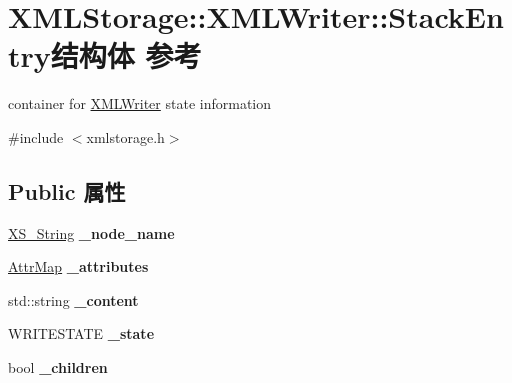 \hypertarget{struct_x_m_l_storage_1_1_x_m_l_writer_1_1_stack_entry}{}\section{X\+M\+L\+Storage\+:\+:X\+M\+L\+Writer\+:\+:Stack\+Entry结构体 参考}
\label{struct_x_m_l_storage_1_1_x_m_l_writer_1_1_stack_entry}


container for \hyperlink{struct_x_m_l_storage_1_1_x_m_l_writer}{X\+M\+L\+Writer} state information  




{\ttfamily \#include $<$xmlstorage.\+h$>$}

\subsection*{Public 属性}
\begin{DoxyCompactItemize}
\item 
\mbox{\label{struct_x_m_l_storage_1_1_x_m_l_writer_1_1_stack_entry_aa9c49efaac6709611c0035b524e575f8}} 
\hyperlink{struct_x_m_l_storage_1_1_x_s___string}{X\+S\+\_\+\+String} {\bfseries \+\_\+node\+\_\+name}
\item 
\mbox{\label{struct_x_m_l_storage_1_1_x_m_l_writer_1_1_stack_entry_a262e3e7c170634a204ea9973b3bfd070}} 
\hyperlink{struct_x_m_l_storage_1_1_x_m_l_node_1_1_attribute_map}{Attr\+Map} {\bfseries \+\_\+attributes}
\item 
\mbox{\label{struct_x_m_l_storage_1_1_x_m_l_writer_1_1_stack_entry_a4535717e47c17b42f97d937be53a0a92}} 
std\+::string {\bfseries \+\_\+content}
\item 
\mbox{\label{struct_x_m_l_storage_1_1_x_m_l_writer_1_1_stack_entry_aee11b91bb5ef42b48ab98c34d1ed29ca}} 
W\+R\+I\+T\+E\+S\+T\+A\+TE {\bfseries \+\_\+state}
\item 
\mbox{\label{struct_x_m_l_storage_1_1_x_m_l_writer_1_1_stack_entry_ae535a5d3e8bad705bc67fdc4f3a65969}} 
bool {\bfseries \+\_\+children}
\end{DoxyCompactItemize}


